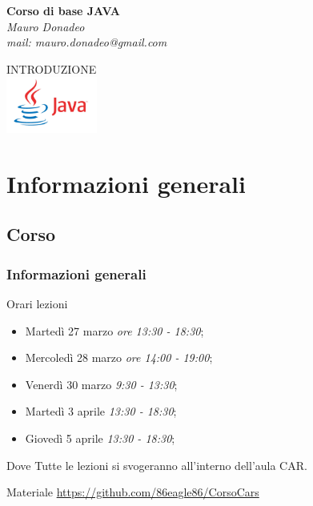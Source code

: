 \begin{frame}
	\begin{block}{}
		\begin{center}
			{\large\textbf{Corso di base JAVA}}\\
			\itshape{Mauro Donadeo}\\
			mail: mauro.donadeo@gmail.com
		\end{center}
	\end{block}
	\begin{block}{}	
		\begin{center}
			\large{INTRODUZIONE}\\
			\includegraphics[width = 30mm]{images/java-logo.jpg}
		\end{center}
	\end{block}	
\end{frame}

\section{Informazioni generali}
\subsection{Corso}
\begin{frame}
\frametitle{Informazioni generali}
\begin{block}{Orari lezioni}
\begin{itemize}
\item Martedì 27 marzo {\itshape ore 13:30 - 18:30};
\item Mercoledì 28 marzo {\itshape ore 14:00 - 19:00};
\item Venerdì 30 marzo {\itshape 9:30 - 13:30};
\item Martedì 3 aprile {\itshape 13:30 - 18:30};
\item Giovedì 5 aprile {\itshape 13:30 - 18:30};
\end{itemize}
\end{block}
\begin{block}{Dove}
Tutte le lezioni si svogeranno all'interno dell'aula CAR.
\end{block}
\begin{block}{Materiale}
\url{https://github.com/86eagle86/CorsoCars}
\end{block}
\end{frame}

